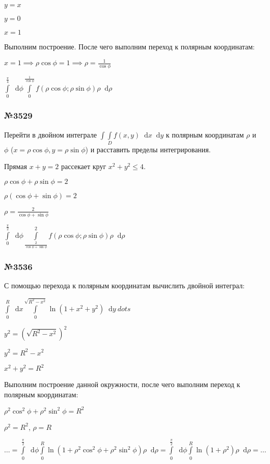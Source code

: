 \documentclass{article}
\newcommand*\diff{\mathop{}\!\mathrm{d}}
\begin{document}
$y=x$

$y=0$

$x=1$

Выполним построение. После чего выполним переход к полярным координатам:

$x = 1 \implies \rho \cos \phi = 1 \implies \rho = \frac{1}{\cos \phi}$

$\int\limits_{0}^{\frac{\pi}{4}} \diff \phi \int\limits_{0}^{\frac{1}{\cos \phi}} f(\rho \cos \phi; \rho \sin \phi) \rho \diff \rho$

\subsubsection{№3529}

Перейти в двойном интеграле $\int\int\limits_{D} f(x, y) \diff x \diff y$ к полярным координатам $\rho$ и $\phi$ ($x = \rho \cos \phi, y = \rho \sin \phi$) и расставить пределы интегрирования.

Прямая $x + y = 2$ рассекает круг $x^2 + y^2 \le 4$.

$\rho \cos \phi + \rho \sin \phi = 2$

$\rho (\cos \phi + \sin \phi) = 2$

$\rho = \frac{2}{\cos \phi + \sin \phi}$

$\int\limits_{0}^{\frac{\pi}{2}} \diff \phi \int\limits_{\frac{2}{\cos \phi + \sin \phi}}^{2} f(\rho \cos \phi; \rho \sin \phi) \rho \diff \rho$

\subsubsection{№3536}

С помощью перехода к полярным координатам вычислить двойной интеграл:

$\int\limits_{0}^{R} \diff x \int\limits_{0}^{\sqrt{R^2-x^2}} \ln (1 + x^2 + y^2) \diff y \ dots$

$y^2 = (\sqrt{R^2-x^2})^2$

$y^2 = R^2 - x^2$

$x^2 + y^2 = R^2$

Выполним построение данной окружности, после чего выполним переход к полярным координатам:

$\rho^2 \cos^2 \phi + \rho^2 \sin^2 \phi = R^2$

$\rho^2 = R^2$, $\rho = R$

$\dots = \int\limits_{0}^{\frac{\pi}{2}} \diff \phi \int\limits_{0}^{R} \ln (1 + \rho^2\cos^2 \phi + \rho^2 \sin^2 \phi) \rho \diff \rho = \int\limits_{0}^{\frac{\pi}{2}} \diff \phi \int\limits_{0}^{R} \ln (1 + \rho^2) \rho \diff \rho = \dots$
\end{document}
